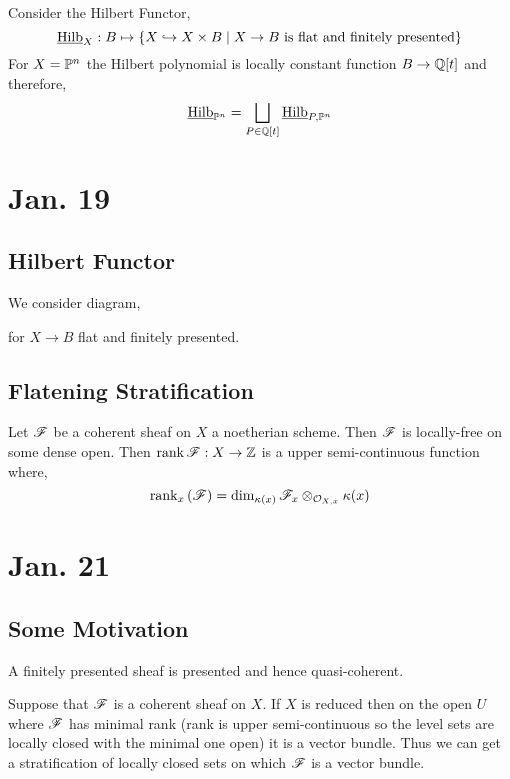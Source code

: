 \documentclass[12pt]{article}
\begin{document}
\newcommand{\sHilb}
{\underline{\Hilb}}

Consider the Hilbert Functor,
\[ \sHilb_X : B \mapsto \{ X \embed X \times B \mid X \to B \text{ is flat and finitely presented} \} \]
For $X = \P^n$ the Hilbert polynomial is locally constant function $B \to \Q[t]$ and therefore,
\[ \sHilb_{\P^n} = \bigsqcup_{P \in \Q[t]} \sHilb_{P, \P^n} \]

\section{Jan. 19}

\subsection{Hilbert Functor} 

We consider diagram,
\begin{center}
\end{center}
for $X \to B$ flat and finitely presented.

\subsection{Flatening Stratification}

Let $\F$ be a coherent sheaf on $X$ a noetherian scheme. Then $\F$ is locally-free on some dense open. Then $\rank{\F} : X \to \Z$ is a upper semi-continuous function where,
\[ \rank_{x}{(\F)} = \dim_{\kappa(x)} \F_x \ot_{\stalk{X}{x}} \kappa(x) \]

\section{Jan. 21}

\subsection{Some Motivation}

\begin{rmk}
A finitely presented sheaf is presented and hence quasi-coherent.
\end{rmk}

Suppose that $\F$ is a coherent sheaf on $X$. If $X$ is reduced then on the open $U$ where $\F$ has minimal rank (rank is upper semi-continuous so the level sets are locally closed with the minimal one open) it is a vector bundle. Thus we can get a stratification of locally closed sets on which $\F$ is a vector bundle. 
\end{document}
